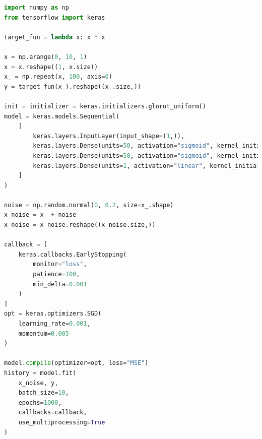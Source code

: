 \documentclass{beamer}
\begin{document}
\begin{landscape}
    \begin{frame}[fragile]


        \begin{lstlisting}[language=Python]
import numpy as np
from tensorflow import keras

target_fun = lambda x: x * x

x = np.arange(0, 10, 1)
x = x.reshape((1, x.size))
x_ = np.repeat(x, 100, axis=0)
y = target_fun(x_).reshape((x_.size,))

init = initializer = keras.initializers.glorot_uniform()
model = keras.models.Sequential(
    [
        keras.layers.InputLayer(input_shape=(1,)),
        keras.layers.Dense(units=50, activation="sigmoid", kernel_initializer=init),
        keras.layers.Dense(units=50, activation="sigmoid", kernel_initializer=init),
        keras.layers.Dense(units=1, activation="linear", kernel_initializer=init),
    ]
)

noise = np.random.normal(0, 0.2, size=x_.shape)
x_noise = x_ + noise
x_noise = x_noise.reshape((x_noise.size,))

callback = [
    keras.callbacks.EarlyStopping(
        monitor="loss",
        patience=100,
        min_delta=0.001
    )
]
opt = keras.optimizers.SGD(
    learning_rate=0.001,
    momentum=0.005
)

model.compile(optimizer=opt, loss="MSE")
history = model.fit(
    x_noise, y,
    batch_size=10,
    epochs=1000,
    callbacks=callback,
    use_multiprocessing=True
)
        \end{lstlisting}

    \end{frame}
\end{landscape}
\end{document}
